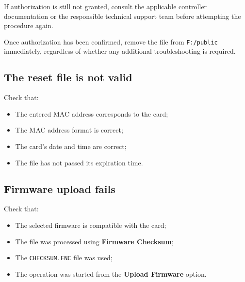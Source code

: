 ﻿\documentclass[11pt,a4paper]{article}
\newcommand{\button}[1]{\textbf{#1}}
\newcommand{\filename}[1]{\texttt{#1}}
\begin{document}
If authorization is still not granted, consult the applicable
controller documentation or the responsible technical support
team before attempting the procedure again.

Once authorization has been confirmed, remove the file from
\filename{F:/public} immediately, regardless of whether any
additional troubleshooting is required.

\subsection{The reset file is not valid}

Check that:

\begin{itemize}
    \item The entered MAC address corresponds to the card;
    \item The MAC address format is correct;
    \item The card's date and time are correct;
    \item The file has not passed its expiration time.
\end{itemize}

\subsection{Firmware upload fails}

Check that:

\begin{itemize}
    \item The selected firmware is compatible with the card;
    \item The file was processed using
    \button{Firmware Checksum};
    \item The \filename{CHECKSUM.ENC} file was used;
    \item The operation was started from the
    \button{Upload Firmware} option.
\end{itemize}
\end{document}
